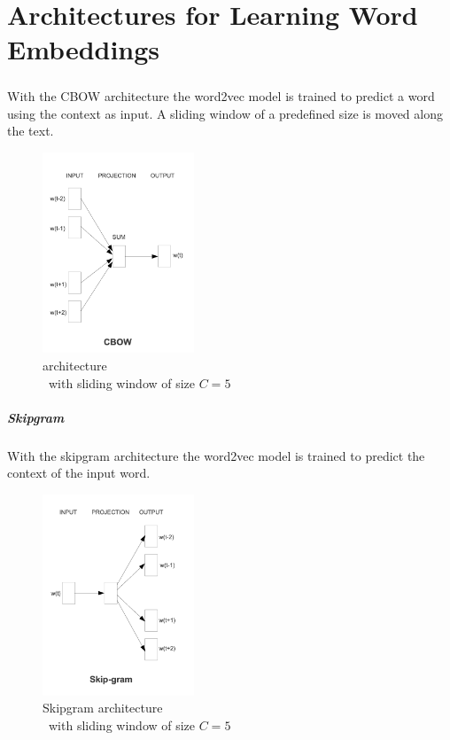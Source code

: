 \newpage

\section{Architectures for Learning Word Embeddings}
 \subparagraph{} 
With the \ac{CBOW} architecture the word2vec model is trained to predict a word using the context as input. A sliding window of a predefined size is moved along the text. 

\begin{figure}[ht]
	\centering
	\includegraphics[height=6cm]{Bilder/word2vec/architecture_cbow.png}
	\caption{ architecture\\\ with sliding window of size $C=5$ }
	\label{fig:cbow-architecture}
\end{figure}

\subparagraph{Skipgram} 
With the skipgram architecture the word2vec model is trained to predict the context of the input word.

\begin{figure}[ht]
	\centering
	\includegraphics[height=6cm]{Bilder/word2vec/architecture_skipgram.png}
	\caption{Skipgram architecture\\\ with sliding window of size $C=5$ }
	\label{fig:skipgram-architecture}
\end{figure}

